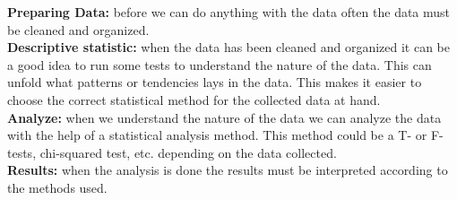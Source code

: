\textbf{Preparing Data:} before we can do anything with the data often the data must be cleaned and organized.\\
\textbf{Descriptive statistic:} when the data has been cleaned and organized it can be a good idea to run some tests to understand the nature of the data. This can unfold what patterns or tendencies lays in the data. This makes it easier to choose the correct statistical method for the collected data at hand.\\
\textbf{Analyze:} when we understand the nature of the data we can analyze the data with the help of a statistical analysis method. This method could be a T- or F-tests, chi-squared test, etc. depending on the data collected.\\ 
\textbf{Results:} when the analysis is done the results must be interpreted according to the methods used.\\






